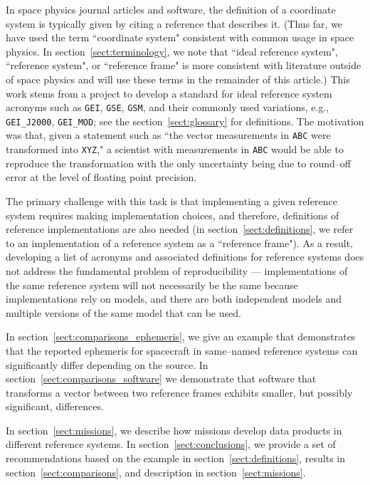 \documentclass[draft]{agujournal2019}
\begin{document}
In space physics journal articles and software, the definition of a coordinate system is typically given by citing a reference that describes it. (Thus far, we have used the term ``coordinate system" consistent with common usage in space physics. In section~\ref{sect:terminology}, we note that ``ideal reference system", ``reference system", or ``reference frame" is more consistent with literature outside of space physics and will use these terms in the remainder of this article.)
This work stems from a project to develop a standard for ideal reference system acronyms such as \texttt{GEI}, \texttt{GSE}, \texttt{GSM}, and their commonly used variations, e.g., \texttt{GEI\_J2000}, \texttt{GEI\_MOD}; see the section~\ref{sect:glossary} for definitions. The motivation was that, given a statement such as ``the vector measurements in \texttt{ABC} were transformed into \texttt{XYZ}," a scientist with measurements in \texttt{ABC} would be able to reproduce the transformation with the only uncertainty being due to round--off error at the level of floating point precision.

The primary challenge with this task is that implementing a given reference system requires making implementation choices, and therefore, definitions of reference implementations are also needed (in section~\ref{sect:definitions}, we refer to an implementation of a reference system as a ``reference frame"). As a result, developing a list of acronyms and associated definitions for reference systems does not address the fundamental problem of reproducibility --- implementations of the same reference system will not necessarily be the same because implementations rely on models, and there are both independent models and multiple versions of the same model that can be used.

In section~\ref{sect:comparisons_ephemeris}, we give an example that demonstrates that the reported ephemeris for spacecraft in same--named reference systems can significantly differ depending on the source. In section~\ref{sect:comparisons_software} we demonstrate that software that transforms a vector between two reference frames exhibits smaller, but possibly significant, differences.

In section~\ref{sect:missions}, we describe how missions develop data products in different reference systems. In section~\ref{sect:conclusions}, we provide a set of recommendations based on the example in section~\ref{sect:definitions}, results in section~\ref{sect:comparisons}, and description in section~\ref{sect:missions}.
\end{document}
